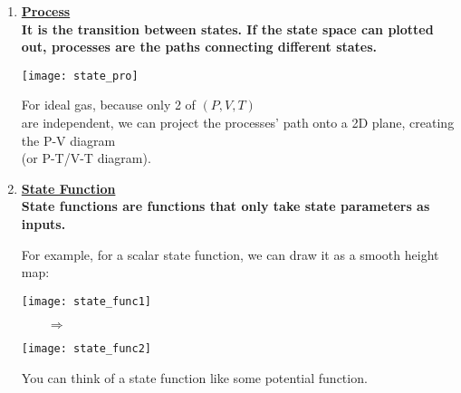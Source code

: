 \documentclass[class=article, crop=false, 12pt]{standalone}
\begin{document}
\begin{enumerate}
    \item \bf{\ul{Process}}\\
    It is the transition between states.
    If the state space can plotted out, 
    processes are the paths connecting different states.

    \begin{center}
        \begin{minipage}{0.25\linewidth}
            \centering
            \texttt{[image: state\_pro]}
        \end{minipage}
        \hspace{0.05\textwidth}
        \begin{minipage}{0.6\linewidth}
            \centering
            For ideal gas, because only 2 of $(P,V,T)$ \\
            are independent,
            we can project the processes' path onto a 2D plane, 
            creating the P-V diagram\\
             (or P-T/V-T diagram).
        \end{minipage}
    \end{center}


    \item \bf{\ul{State Function}}\\
    State functions are functions that only take state parameters as inputs.
    \begin{center}
    \end{center}

    For example, for a scalar state function,
    we can draw it as a smooth height map:

    \begin{center}
        \begin{minipage}{0.4\linewidth}
            \centering
            \texttt{[image: state\_func1]}
        \end{minipage}
        $\qquad\Rightarrow\qquad$
        \begin{minipage}{0.4\linewidth}
            \centering
            \texttt{[image: state\_func2]}
        \end{minipage}
    \end{center}

    You can think of a state function like some potential function.



\end{enumerate}
\end{document}
